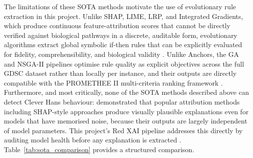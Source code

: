 {The limitations of these SOTA methods motivate the use of evolutionary rule extraction in this
project. Unlike SHAP, LIME, LRP, and Integrated Gradients, which produce continuous
feature-attribution scores that cannot be directly verified against biological pathways in a
discrete, auditable form, evolutionary algorithms extract global symbolic if-then rules that can be
explicitly evaluated for fidelity, comprehensibility, and biological validity \cite{Yedjour2024}.
Unlike Anchors, the GA and NSGA-II pipelines optimise rule quality as explicit objectives across the
full GDSC dataset rather than locally per instance, and their outputs are directly compatible with
the PROMETHEE II multi-criteria ranking framework \cite{Yedjour2024}. Furthermore, and most
critically, none of the SOTA methods described above can detect Clever Hans behaviour:
\cite{Adebayo2018} demonstrated that popular attribution methods including SHAP-style approaches
produce visually plausible explanations even for models that have memorised noise, because their
outputs are largely independent of model parameters. This project's Red XAI pipeline addresses this
directly by auditing model health before any explanation is extracted \cite{Biecek2024}.
Table~\ref{tab:sota_comparison} provides a structured comparison.

}